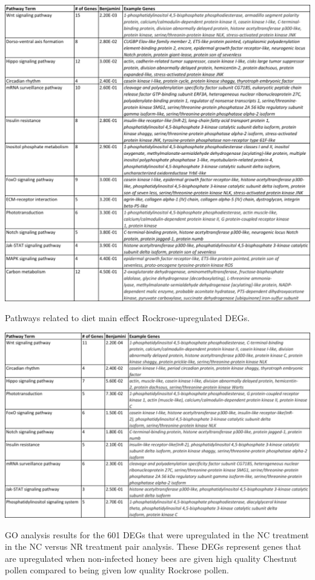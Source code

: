 \documentclass[11pt,a4paper,oldfontcommands,openany]{memoir}
\numberwithin{equation}{section} %
\begin{document}
\begin{table}[H]
  \includegraphics[width=\textwidth]{Images/ChestnutPathways}
  \caption{Pathways related to diet main effect Rockrose-upregulated DEGs.}
  \label{tbl:RockrosePathways}
\end{table}

\begin{table}[H]
  \includegraphics[width=\textwidth]{Images/NCNRNCPathways}
  \caption{GO analysis results for the 601 DEGs that were upregulated in the NC treatment in the NC versus NR treatment pair analysis. These DEGs represent genes that are upregulated when non-infected honey bees are given high quality Chestnut pollen compared to being given low quality Rockrose pollen.}
  \label{tbl:NCNRNCPathways}
\end{table}
\end{document}
